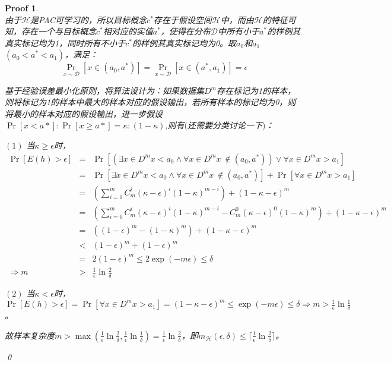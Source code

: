 \documentclass[a4paper,UTF8]{article}
\numberwithin{equation}{section}
\newtheorem*{myProof}{Proof}
\begin{document}
\begin{myProof}~\\

由于$\mathcal{H}$是PAC可学习的，所以目标概念$c^*$存在于假设空间$\mathcal{H}$中，而由$\mathcal{H}$的特征可知，存在一个与目标概念$c^*$相对应的实值$a^*$，使得在分布$\mathcal{D}$中所有小于$a^*$的样例其真实标记均为1，同时所有不小于$c^*$的样例其真实标记均为0。取$a_0$和$a_1$$(a_0 < a^* < a_1)$，满足：
\[
\Pr_{x \sim \mathcal{D}}[x \in (a_0, a^*)] = \Pr_{x \sim \mathcal{D}}[x \in (a^*, a_1)] = \epsilon
\]

基于经验误差最小化原则，将算法设计为：如果数据集$D^m$存在标记为1的样本，则将标记为1的样本中最大的样本对应的假设输出，若所有样本的标记均为0，则将最小的样本对应的假设输出，进一步假设$\Pr[x < a*] : \Pr[x \ge a*] = \kappa : (1 - \kappa)$,则有$($还需要分类讨论一下$)$：

$(1)$ 当$\kappa \ge \epsilon$时，
\begin{eqnarray*}
\Pr[E(h) > \epsilon] &=& \Pr[\left(\exists x \in D^m x < a_0 \land \forall x \in D^m x \ \notin (a_0, a^*)\right) \lor \forall x \in D^m x > a_1 ] \\
&=& \Pr[\exists x \in D^m x < a_0 \land \forall x \in D^m x \ \notin (a_0, a^*)] + \Pr[ \forall x \in D^m x > a_1 ] \\
&=& \left(\sum_{i=1}^m C_m^i (\kappa - \epsilon)^i(1-\kappa)^{m-i}\right) + (1-\kappa - \epsilon)^m \\
&=& \left(\sum_{i=0}^m C_m^i (\kappa - \epsilon)^i(1-\kappa)^{m-i} - C_m^0(\kappa - \epsilon)^0(1 - \kappa)^m \right) + (1-\kappa - \epsilon)^m \\
&=& \left((1 - \epsilon)^m - (1 - \kappa)^m \right) + (1-\kappa - \epsilon)^m \\
&<& (1 - \epsilon)^m + (1- \epsilon)^m \\
&=& 2(1 - \epsilon)^m \le 2\exp(-m\epsilon) \le \delta \\
\Longrightarrow m &>& \frac{1}{\epsilon} \ln \frac{2}{\delta} 
\end{eqnarray*}

$(2)$ 当$\kappa < \epsilon$时，$\Pr[E(h) > \epsilon] = \Pr[\forall x \in D^m x > a_1 ] = (1-\kappa - \epsilon)^m \le \exp(-m\epsilon) \le \delta 	\Longrightarrow m > \frac{1}{\epsilon} \ln \frac{1}{\delta} $。

故样本复杂度$m > \max(\frac{1}{\epsilon} \ln \frac{2}{\delta}, \frac{1}{\epsilon} \ln \frac{1}{\delta}) = \frac{1}{\epsilon} \ln \frac{2}{\delta}$，即$m_{\mathcal{H}}(\epsilon, \delta) \le \lceil \frac{1}{\epsilon} \ln \frac{2}{\delta}\rceil$。

\qed
\end{myProof}
\newpage
\end{document}
